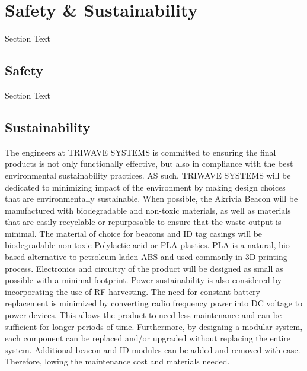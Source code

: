 \setcounter{section}{4}
\section{Safety \& Sustainability}
\bigskip
Section Text

\break
\subsection{Safety}
\bigskip
Section Text


\break
\subsection{Sustainability}
\bigskip
The engineers at TRIWAVE SYSTEMS is committed to ensuring the final products is not only functionally effective, but also in compliance with the best environmental sustainability practices. AS such, TRIWAVE SYSTEMS will be dedicated to minimizing impact of the environment by making design choices that are environmentally sustainable. When possible, the Akrivia Beacon will be manufactured with biodegradable and non-toxic materials, as well as materials that are easily recyclable or repurposable to ensure that the waste output is minimal. The material of choice for beacons and ID tag casings will be biodegradable non-toxic Polylactic acid or PLA plastics. PLA is a natural, bio based alternative to petroleum laden ABS and used commonly in 3D printing process. Electronics and circuitry of the product will be designed as small as possible with a minimal footprint. Power sustainability is also considered by incorporating the use of RF harvesting. The need for constant battery replacement is minimized by converting radio frequency power into DC voltage to power devices. This allows the product to need less maintenance and can be sufficient for longer periods of time. Furthermore, by designing a modular system, each component can be replaced and/or upgraded without replacing the entire system. Additional beacon and ID modules can be added and removed with ease. Therefore, lowing the maintenance cost and materials needed.
